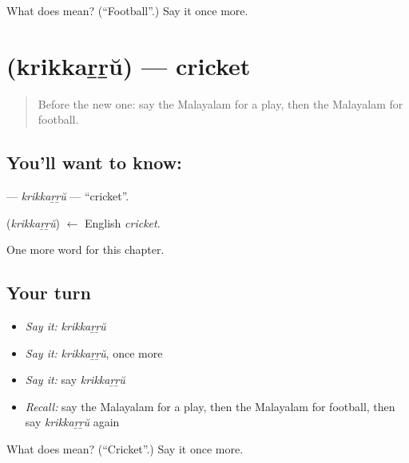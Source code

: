 \begin{tcolorbox}[breakable,colback=teal!4,colframe=teal!35!black,title={Before you move on}]
What does  mean? (\textquotedblleft{}Football\textquotedblright{}.) Say it once more.
\end{tcolorbox}
\section[\texorpdfstring{\ml{ക്രിക്കറ്റ്} (krikkaṟṟŭ)}{ക്രിക്കറ്റ് (krikkaṟṟŭ)}]{ (krikkaṟṟŭ) — cricket}

\label{lesson:ML-C329-krikkarru}



\begin{quote}
Before the new one: say the Malayalam for a play, then the Malayalam for football.
\end{quote}

\subsection*{You'll want to know: }
\textbf{} — \emph{krikkaṟṟŭ} — \textquotedblleft{}cricket\textquotedblright{}.

\begin{cousinweb}
\textbf{} (\emph{krikkaṟṟŭ}) $\leftarrow$ English \emph{cricket}.
\end{cousinweb}

\begin{grammarlens}[title={What you've built}]
One more word for this chapter.
\end{grammarlens}

\subsection*{Your turn}
\begin{itemize}
\raggedright
  \item \emph{Say it:} \emph{krikkaṟṟŭ}
  \item \emph{Say it:} \emph{krikkaṟṟŭ}, once more
  \item \emph{Say it:} say \emph{krikkaṟṟŭ}
  \item \emph{Recall:} say the Malayalam for a play, then the Malayalam for football, then say \emph{krikkaṟṟŭ} again
\end{itemize}

\begin{tcolorbox}[breakable,colback=teal!4,colframe=teal!35!black,title={Before you move on}]
What does  mean? (\textquotedblleft{}Cricket\textquotedblright{}.) Say it once more.
\end{tcolorbox}
